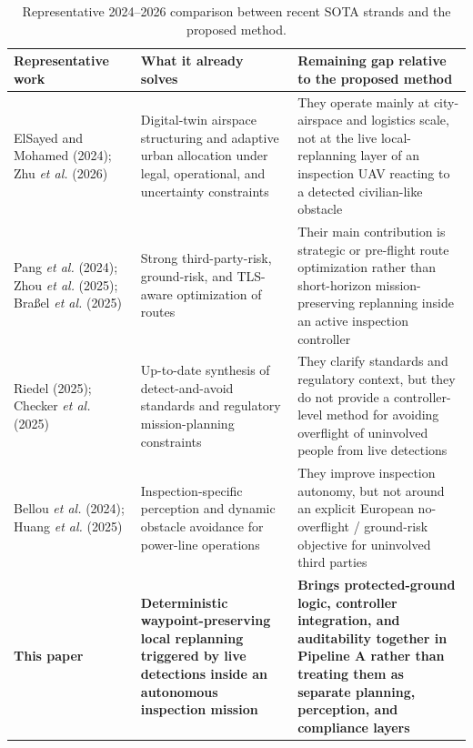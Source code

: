 \documentclass[a4paper,11pt]{article}
\begin{document}
\begin{table}[H]
    \centering
    \footnotesize
    \begin{tabularx}{\linewidth}{@{}Y Y Y@{}}
        \toprule
        \textbf{Representative work} & \textbf{What it already solves} & \textbf{Remaining gap relative to the proposed method} \\
        \midrule
        ElSayed and Mohamed (2024); Zhu \emph{et al.} (2026) \cite{elsayed2024digitaltwin,zhu2026adaptive} & Digital-twin airspace structuring and adaptive urban allocation under legal, operational, and uncertainty constraints & They operate mainly at city-airspace and logistics scale, not at the live local-replanning layer of an inspection UAV reacting to a detected civilian-like obstacle \\
        Pang \emph{et al.} (2024); Zhou \emph{et al.} (2025); Bra{\ss}el \emph{et al.} (2025) \cite{pang2024stochastic,zhou2025riskbased,brassel2025riskaware} & Strong third-party-risk, ground-risk, and TLS-aware optimization of routes & Their main contribution is strategic or pre-flight route optimization rather than short-horizon mission-preserving replanning inside an active inspection controller \\
        Riedel (2025); Checker \emph{et al.} (2025) \cite{riedel2025daa,checker2025regulatory} & Up-to-date synthesis of detect-and-avoid standards and regulatory mission-planning constraints & They clarify standards and regulatory context, but they do not provide a controller-level method for avoiding overflight of uninvolved people from live detections \\
        Bellou \emph{et al.} (2024); Huang \emph{et al.} (2025) \cite{bellou2024aerial,huang2025hybrid} & Inspection-specific perception and dynamic obstacle avoidance for power-line operations & They improve inspection autonomy, but not around an explicit European no-overflight / ground-risk objective for uninvolved third parties \\
        \textbf{This paper} & \textbf{Deterministic waypoint-preserving local replanning triggered by live detections inside an autonomous inspection mission} & \textbf{Brings protected-ground logic, controller integration, and auditability together in Pipeline A rather than treating them as separate planning, perception, and compliance layers} \\
        \bottomrule
    \end{tabularx}
    \caption{Representative 2024--2026 comparison between recent SOTA strands and the proposed method.}
    \label{tab:sota_positioning}
\end{table}
\end{document}
